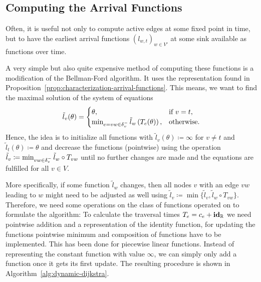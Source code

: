 \subsection{Computing the Arrival Functions}

Often, it is useful not only to compute active edges at some fixed point in time, but to have the earliest arrival functions $(l_{w,t})_{w\in V'}$ at some sink available as functions over time.

A very simple but also quite expensive method of computing these functions is a modification of the Bellman-Ford algorithm. 
It uses the representation found in Proposition~\ref{prop:characterization-arrival-functions}.
This means, we want to find the maximal solution of the system of equations \[
    \tilde l_v(\theta) = \begin{cases}
        \theta, &\text{if $v = t$}, \\
        \min_{\substack{
            e=vw\in\delta^-_{v}               
        }} \tilde{l}_w\left(
            T_e(\theta)
        \right), &\text{otherwise}.
    \end{cases}
\]
Hence, the idea is to initialize all functions with $\tilde l_v(\theta) \coloneqq \infty$ for $v\neq t$ and $\tilde l_t(\theta) \coloneqq \theta$ and decrease the functions (pointwise) using the operation $\tilde l_v \coloneqq \min_{vw\in\delta^-_{v}} \tilde l_w \circ T_{vw}$ until no further changes are made and the equations are fulfilled for all $v\in V$.

More specifically, if some function $\tilde l_w$ changes, then all nodes $v$ with an edge $vw$ leading to $w$ might need to be adjusted as well using $\tilde l_v \coloneqq \min\{ \tilde l_v, \tilde l_w \circ T_{vw} \}$.
Therefore, we need some operations on the class of functions operated on to formulate the algorithm:
To calculate the traversal times $T_e = c_e + \mathbf{id}_{\mathbb{R}}$ we need pointwise addition and a representation of the identity function, for updating the functions pointwise minimum and composition of functions have to be implemented.
This has been done for piecewise linear functions.
Instead of representing the constant function with value $\infty$, we can simply only add a function once it gets its first update.
The resulting procedure is shown in Algorithm~\ref{alg:dynamic-dijkstra}.

